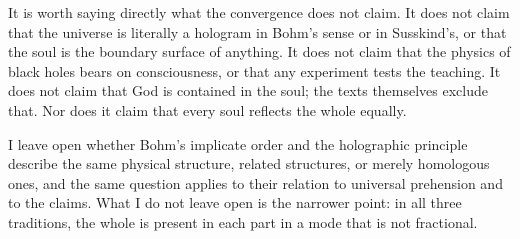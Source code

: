 It is worth saying directly what the convergence does not claim.
It does not claim that the universe is literally a hologram in Bohm's sense or in Susskind's, or that the soul is the boundary surface of anything.
It does not claim that the physics of black holes bears on consciousness, or that any experiment tests the \bahai teaching.
It does not claim that God is contained in the soul; the texts themselves exclude that.
Nor does it claim that every soul reflects the whole equally.

I leave open whether Bohm's implicate order and the holographic principle describe the same physical structure, related structures, or merely homologous ones, and the same question applies to their relation to universal prehension and to the \bahai claims.
What I do not leave open is the narrower point: in all three traditions, the whole is present in each part in a mode that is not fractional.

